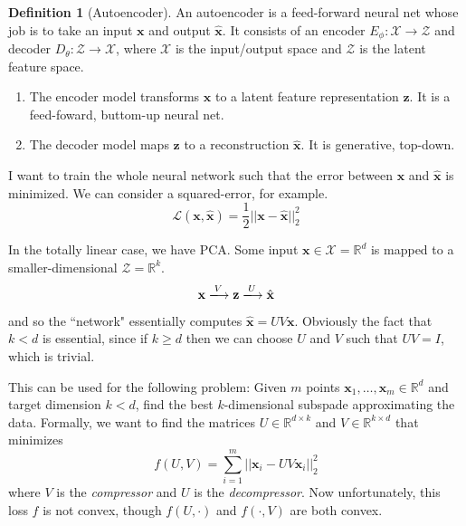 \documentclass{article}
\theoremstyle{definition}
\theoremstyle{remark}
\theoremstyle{definition}
\newtheorem{definition}{Definition}[section]
\begin{document}
  \begin{definition}[Autoencoder]
    An autoencoder is a feed-forward neural net whose job is to take an input $\mathbf{x}$ and output $\hat{\mathbf{x}}$. It consists of an encoder $E_\phi: \mathcal{X} \rightarrow \mathcal{Z}$ and decoder $D_\theta: \mathcal{Z} \rightarrow \mathcal{X}$, where $\mathcal{X}$ is the input/output space and $\mathcal{Z}$ is the latent feature space. 

    \begin{enumerate}
      \item The encoder model transforms $\mathbf{x}$ to a latent feature representation $\mathbf{z}$. It is a feed-foward, buttom-up neural net. 
      \item The decoder model maps $\mathbf{z}$ to a reconstruction $\hat{\mathbf{x}}$. It is generative, top-down. 
    \end{enumerate}

    I want to train the whole neural network such that the error between $\mathbf{x}$ and $\hat{\mathbf{x}}$ is minimized. We can consider a squared-error, for example. 
      \[\mathcal{L}(\mathbf{x}, \hat{\mathbf{x}}) = \frac{1}{2} ||\mathbf{x} - \hat{\mathbf{x}}||_2^2\]
  \end{definition}

  In the totally linear case, we have PCA. Some input $\mathbf{x} \in \mathcal{X} = \mathbb{R}^d$ is mapped to a smaller-dimensional $\mathcal{Z} = \mathbb{R}^k$. 
  \[\mathbf{x} \xlongrightarrow[]{V} \mathbf{z} \xlongrightarrow{U} \hat{\mathbf{x}}\]
  and so the ``network" essentially computes $\hat{\mathbf{x}} = U V \mathbf{x}$. Obviously the fact that $k < d$ is essential, since if $k \geq d$ then we can choose $U$ and $V$ such that $UV = I$, which is trivial. 

  This can be used for the following problem: Given $m$ points $\mathbf{x}_1, \ldots, \mathbf{x}_m \in \mathbb{R}^d$ and target dimension $k < d$, find the best $k$-dimensional subspade approximating the data. Formally, we want to find the matrices $U \in \mathbb{R}^{d \times k}$ and $V \in \mathbb{R}^{k \times d}$ that minimizes 
  \[f(U, V) = \sum_{i=1}^m ||\mathbf{x}_i - U V \mathbf{x}_i||_2^2 \] 
  where $V$ is the \textit{compressor} and $U$ is the \textit{decompressor}. Now unfortunately, this loss $f$ is not convex, though $f(U, \cdot)$ and $f(\cdot, V)$ are both convex. 
\end{document}
